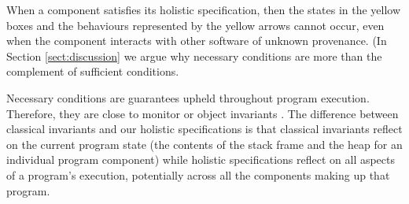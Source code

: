 When a component satisfies its holistic specification,
then the states  in the yellow boxes and the 
behaviours
represented  by the yellow arrows cannot occur, even when the
component interacts with other software of unknown provenance.
(In Section \ref{sect:discussion} we argue why necessary conditions are more than the complement of
sufficient conditions.

 
Necessary conditions are guarantees upheld throughout program execution.
Therefore, they are close to monitor or object
invariants \cite{Hoare74,Meyer97}. The difference between 
classical invariants and our holistic specifications is that classical invariants  reflect  on
the current program state (\ie the contents of the
stack frame and the heap for an individual program component) while
holistic specifications reflect on all aspects of a program's
execution, potentially across all the components making up that program.


